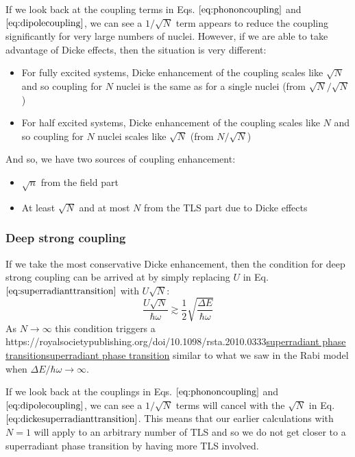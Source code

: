 \documentclass[
]{article}
\let\oldhref\href
\renewcommand{\href}[2]{\ifx#1\urlprefix\oldhref{#1}{#2}\else\uline{\oldhref{#1}{#2}}\fi}
\renewcommand{\[}{\begin{equation}}
\renewcommand{\]}{\end{equation}}
\providecommand{\tightlist}{%
  \setlength{\itemsep}{0pt}\setlength{\parskip}{0pt}}
\begin{document}
If we look back at the coupling terms in Eqs.
\(\ref{eq:phononcoupling}\) and \(\ref{eq:dipolecoupling}\), we can see
a \(1/\sqrt{N}\) term appears to reduce the coupling significantly for
very large numbers of nuclei. However, if we are able to take advantage
of Dicke effects, then the situation is very different:

\begin{itemize}
\tightlist
\item
  For fully excited systems, Dicke enhancement of the coupling scales
  like \(\sqrt{N}\) and so coupling for \(N\) nuclei is the same as for
  a single nuclei (from \(\sqrt{N}/\sqrt{N}\))
\item
  For half excited systems, Dicke enhancement of the coupling scales
  like \(N\) and so coupling for \(N\) nuclei scales like \(\sqrt{N}\)
  (from \(N/\sqrt{N}\))
\end{itemize}

And so, we have two sources of coupling enhancement:

\begin{itemize}
\tightlist
\item
  \(\sqrt{n}\) from the field part
\item
  At least \(\sqrt{N}\) and at most \(N\) from the TLS part due to Dicke
  effects
\end{itemize}

\subsubsection{Deep strong coupling}\label{deep-strong-coupling-2}

If we take the most conservative Dicke enhancement, then the condition
for deep strong coupling can be arrived at by simply replacing \(U\) in
Eq. \(\ref{eq:superradianttransition}\) with \(U\sqrt{N{}}\): \[
\frac{U\sqrt{N}}{\hbar\omega} \gtrsim \frac{1}{2}\sqrt{\frac{\Delta E}{\hbar\omega}}
\label{eq:dickesuperradianttransition}
\] As \(N\rightarrow \infty\) this condition triggers a
\href{https://royalsocietypublishing.org/doi/10.1098/rsta.2010.0333}{superradiant
phase transition} similar to what we saw in the Rabi model when
\(\Delta E / \hbar\omega \rightarrow \infty\).

If we look back at the couplings in Eqs. \(\ref{eq:phononcoupling}\) and
\(\ref{eq:dipolecoupling}\), we can see a \(1/\sqrt{N}\) terms will
cancel with the \(\sqrt{N}\) in Eq.
\(\ref{eq:dickesuperradianttransition}\). This means that our earlier
calculations with \(N=1\) will apply to an arbitrary number of TLS and
so we do not get closer to a superradiant phase transition by having
more TLS involved.
\end{document}
